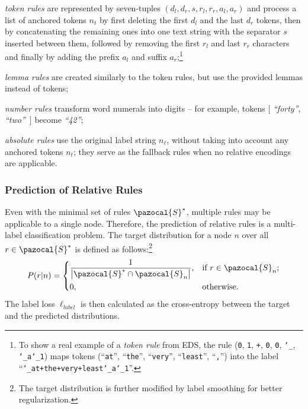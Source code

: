 \documentclass[11pt,a4paper]{article}
\newenvironment{cenumerate}{\begin{list}{\labelenumi}{\usecounter{enumi}\topsep=.2\smallskipamount\itemsep=0pt\parsep=1pt\labelwidth=1.0em}}{\end{list}}
\begin{document}
\begin{cenumerate}
    \item \emph{token rules} are represented by seven-tuples $(d_l, d_r, s, r_l, r_r, a_l, a_r)$ and process a list of anchored tokens $n_t$ by first deleting the first $d_l$ and the last $d_r$ tokens, then by concatenating the remaining ones into one text string with the separator $s$ inserted between them, followed by removing the first $r_l$ and last $r_r$ characters and finally by adding the prefix $a_l$ and suffix $a_r$;\footnote{To show a real example of a \emph{token rule} from EDS, the rule (\texttt{0}, \texttt{1}, \texttt{+}, \texttt{0}, \texttt{0}, \texttt{\char`_}, \texttt{\char`_a\char`_1}) maps tokens (``\texttt{at}'', ``\texttt{the}'', ``\texttt{very}'', ``\texttt{least}'', ``\texttt{,}'') into the label ``\texttt{\char`_at+the+very+least\char`_a\char`_1}''.}
    
    \item \emph{lemma rules} are created similarly to the token rules, but use the provided lemmas instead of tokens;
    
    \item \emph{number rules} transform word numerals into digits -- for example, tokens $[$ \emph{``forty''}, \emph{``two''}~$]$ become \emph{``42''};
    
    \item \emph{absolute rules} use the original label string $n_\ell$, without taking into account any anchored tokens $n_t$; they serve as the fallback rules when no relative encodings are applicable.
\end{cenumerate}





\subsubsection{Prediction of Relative Rules}
\label{section:mos}

Even with the minimal set of rules $\pazocal{S}^*$, multiple rules may be applicable to a single node. Therefore,
the prediction of relative rules is a multi-label classification problem. The target distribution for a node $n$ over all $r \in \pazocal{S}^*$ is defined as follows:\footnote{The target distribution is further modified by label smoothing \cite{szegedy2016rethinking} for better regularization.}
$$
    P(r \vert n) = 
\begin{dcases}
    \frac{1}{\left\vert \pazocal{S}^* \cap  \pazocal{S}_n \right\vert},& \text{if } r \in \pazocal{S}_n; \\
    0,              & \text{otherwise}.
\end{dcases}
$$
The label loss $\ell_{label}$ is then calculated as the cross-entropy between the target and the predicted distributions.
\end{document}
